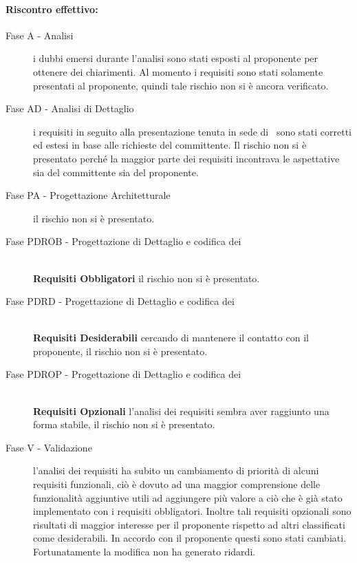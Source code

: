 \documentclass[../PianoProgetto.tex]{subfiles}
\begin{document}
	\paragraph*{Riscontro effettivo:}
		\begin{description}
			\item[Fase A - Analisi] i dubbi emersi durante l'analisi sono stati esposti al proponente per ottenere dei chiarimenti. Al momento i requisiti sono stati solamente presentati al proponente, quindi tale rischio non si è ancora verificato.
			\item[Fase AD - Analisi di Dettaglio]  i requisiti in seguito alla presentazione tenuta in sede di \revisionedeirequisiti\ sono stati corretti ed estesi in base alle richieste del committente. Il rischio non si è presentato perché la maggior parte dei requisiti incontrava le aspettative sia del committente sia del proponente. 
			\item[Fase PA - Progettazione Architetturale] il rischio non si è presentato.
			\item[Fase PDROB - Progettazione di Dettaglio e codifica dei]  \ \\
					\textbf{Requisiti Obbligatori} il rischio non si è presentato.
			\item[Fase PDRD - Progettazione di Dettaglio e codifica dei] \ \\
					\textbf{Requisiti Desiderabili} cercando di mantenere il contatto con il proponente, il rischio non si è presentato.
			\item[Fase PDROP - Progettazione di Dettaglio e codifica dei]  \ \\
					\textbf{Requisiti Opzionali} l'analisi dei requisiti sembra aver raggiunto una forma stabile, il rischio non si è presentato.
			\item[Fase V - Validazione] l'analisi dei requisiti ha subito un cambiamento di priorità di alcuni requisiti funzionali, ciò è dovuto ad una maggior comprensione delle funzionalità aggiuntive utili ad aggiungere più valore a ciò che è già stato implementato con i requisiti obbligatori. Inoltre tali requisiti opzionali sono risultati di maggior interesse per il proponente rispetto ad altri classificati come desiderabili. In accordo con il proponente questi sono stati cambiati. Fortunatamente la modifica non ha generato ridardi.
		\end{description}

			
\end{document}
